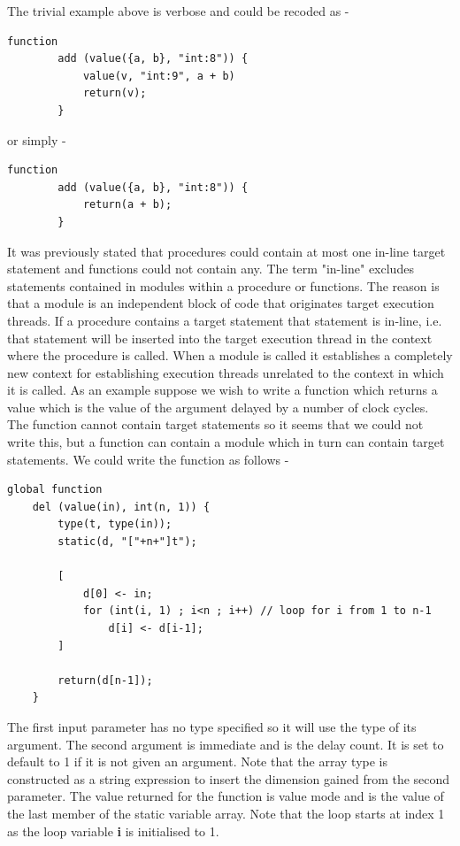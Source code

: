 \documentclass[10pt,a4paper,twoside,fleqn]{article}
\newcommand{\var}[1]{{\bf #1}} %
\begin{document}
    The trivial example above is verbose and could be recoded as -
    \begin{lstlisting}[language=threepl]
        function
        add (value({a, b}, "int:8")) {
            value(v, "int:9", a + b)
            return(v);
        }
    \end{lstlisting}
    or simply -
    \begin{lstlisting}[language=threepl]
        function
        add (value({a, b}, "int:8")) {
            return(a + b);
        }
    \end{lstlisting}
      
    It was previously stated that procedures could contain at most one in-line
    target statement and functions could not contain any. The term "in-line"
    excludes statements contained in modules within a procedure or functions. The
    reason is that a module is an independent block of code that originates target
    execution threads. If a procedure contains a target statement that statement is
    in-line, i.e. that statement will be inserted into the target execution thread
    in the context where the procedure is called. When a module is called it
    establishes a completely new context for establishing execution threads
    unrelated to the context in which it is called. As an example suppose we wish
    to write a function which returns a value which is the value of the argument
    delayed by a number of clock cycles. The function cannot contain target
    statements so it seems that we could not write this, but a function can contain
    a module which in turn can contain target statements. We could write the
    function as follows -
    \begin{lstlisting}[language=threepl]
    global function
    del (value(in), int(n, 1)) {
        type(t, type(in));
        static(d, "["+n+"]t");

        [
            d[0] <- in;
            for (int(i, 1) ; i<n ; i++) // loop for i from 1 to n-1
                d[i] <- d[i-1];
        ]

        return(d[n-1]);
    }
    \end{lstlisting}
    The first input parameter has no type specified so it will use the type of its
    argument. The second argument is immediate and is the delay count. It is set to
    default to 1 if it is not given an argument. Note that the array type is
    constructed as a string expression to insert the dimension gained from the
    second parameter. The value returned for the function is value mode and is the
    value of the last member of the static variable array. Note that the loop
    starts at index 1 as the loop variable \var{i} is initialised to 1.
\end{document}
